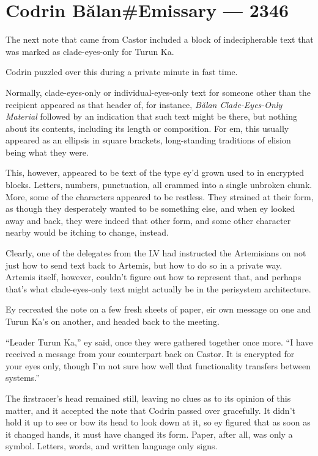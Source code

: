\hypertarget{codrin-bux103lanemissary-2346}{%
\chapter{Codrin Bălan\#Emissary — 2346}\label{codrin-bux103lanemissary-2346}}

The next note that came from Castor included a block of indecipherable text that was marked as clade-eyes-only for Turun Ka.

Codrin puzzled over this during a private minute in fast time.

Normally, clade-eyes-only or individual-eyes-only text for someone other than the recipient appeared as that header of, for instance, \emph{Bălan Clade-Eyes-Only Material} followed by an indication that such text might be there, but nothing about its contents, including its length or composition. For em, this usually appeared as an ellipsis in square brackets, long-standing traditions of elision being what they were.

This, however, appeared to be text of the type ey'd grown used to in encrypted blocks. Letters, numbers, punctuation, all crammed into a single unbroken chunk. More, some of the characters appeared to be restless. They strained at their form, as though they desperately wanted to be something else, and when ey looked away and back, they were indeed that other form, and some other character nearby would be itching to change, instead.

Clearly, one of the delegates from the LV had instructed the Artemisians on not just how to send text back to Artemis, but how to do so in a private way. Artemis itself, however, couldn't figure out how to represent that, and perhaps that's what clade-eyes-only text might actually be in the perisystem architecture.

Ey recreated the note on a few fresh sheets of paper, eir own message on one and Turun Ka's on another, and headed back to the meeting.

``Leader Turun Ka,'' ey said, once they were gathered together once more. ``I have received a message from your counterpart back on Castor. It is encrypted for your eyes only, though I'm not sure how well that functionality transfers between systems.''

The firstracer's head remained still, leaving no clues as to its opinion of this matter, and it accepted the note that Codrin passed over gracefully. It didn't hold it up to see or bow its head to look down at it, so ey figured that as soon as it changed hands, it must have changed its form. Paper, after all, was only a symbol. Letters, words, and written language only signs.

